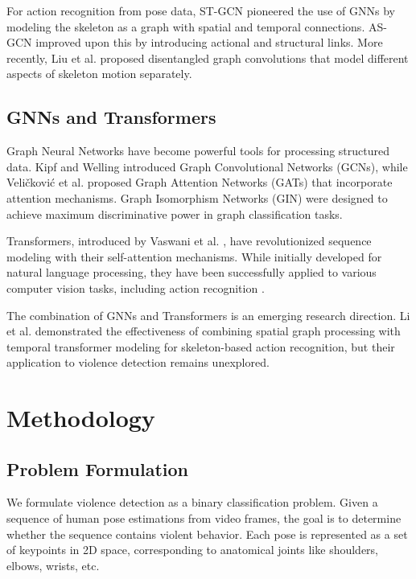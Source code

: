 \documentclass[conference]{IEEEtran}
\begin{document}
For action recognition from pose data, ST-GCN \cite{yan2018spatial} pioneered
the use of GNNs by modeling the skeleton as a graph with spatial and temporal
connections. AS-GCN \cite{li2019actional} improved upon this by introducing
actional and structural links. More recently, Liu et al.
\cite{liu2020disentangling} proposed disentangled graph convolutions that model
different aspects of skeleton motion separately.

\subsection{GNNs and Transformers}
Graph Neural Networks have become powerful tools for processing structured
data. Kipf and Welling \cite{kipf2017semi} introduced Graph Convolutional
Networks (GCNs), while Veličković et al. \cite{velivckovic2018graph} proposed
Graph Attention Networks (GATs) that incorporate attention mechanisms. Graph
Isomorphism Networks (GIN) \cite{xu2018powerful} were designed to achieve
maximum discriminative power in graph classification tasks.

Transformers, introduced by Vaswani et al. \cite{vaswani2017attention}, have
revolutionized sequence modeling with their self-attention mechanisms. While
initially developed for natural language processing, they have been
successfully applied to various computer vision tasks, including action
recognition \cite{girdhar2019video}.

The combination of GNNs and Transformers is an emerging research direction. Li
et al. \cite{li2021spatio} demonstrated the effectiveness of combining spatial
graph processing with temporal transformer modeling for skeleton-based action
recognition, but their application to violence detection remains unexplored.

\section{Methodology}

\subsection{Problem Formulation}
We formulate violence detection as a binary classification problem. Given a
sequence of human pose estimations from video frames, the goal is to determine
whether the sequence contains violent behavior. Each pose is represented as a
set of keypoints in 2D space, corresponding to anatomical joints like
shoulders, elbows, wrists, etc.
\end{document}
